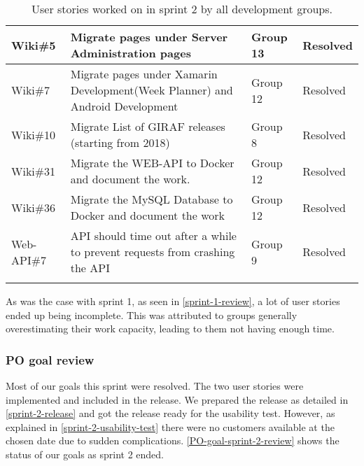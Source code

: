 \begin{longtable}{|p{2.8cm}|p{7cm}|p{1.5cm}|p{1.8cm}|}
    Wiki\#5         & Migrate pages under Server Administration pages                                                                                                                                          & Group 13        & Resolved    \\ \hline
    Wiki\#7         & Migrate pages under Xamarin Development(Week Planner) and Android Development                                                                                                            & Group 12        & Resolved    \\ \hline
    Wiki\#10        & Migrate List of GIRAF releases (starting from 2018)                                                                                                                                      & Group 8         & Resolved    \\ \hline
    Wiki\#31        & Migrate the WEB-API to Docker and document the work.                                                                                                                                     & Group 12        & Resolved    \\ \hline
    Wiki\#36        & Migrate the MySQL Database to Docker and document the work                                                                                                                               & Group 12        & Resolved    \\ \hline
    Web-API\#7      & API should time out after a while to prevent requests from crashing the API                                                                                                              & Group 9         & Resolved    \\ \hline
    \caption{User stories worked on in sprint 2 by all development groups.}\label{sprint-2-review-table}
\end{longtable}
\noindent
As was the case with sprint 1, as seen in \autoref{sprint-1-review}, a lot of user stories ended up being incomplete.
This was attributed to groups generally overestimating their work capacity, leading to them not having enough time.

\subsubsection{PO goal review}
Most of our goals this sprint were resolved.
The two user stories were implemented and included in the release. 
We prepared the release as detailed in \autoref{sprint-2-release} and got the release ready for the usability test.
However, as explained in \autoref{sprint-2-usability-test} there were no customers available at the chosen date due to sudden complications.
\autoref{PO-goal-sprint-2-review} shows the status of our goals as sprint 2 ended.


